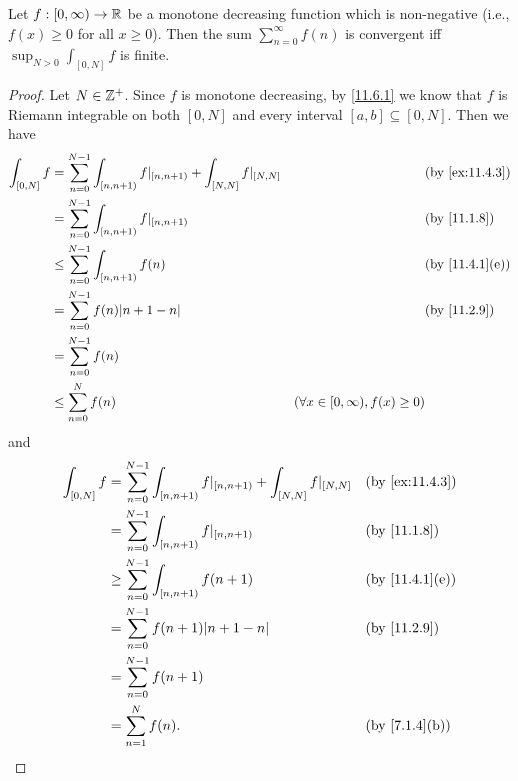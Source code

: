 \begin{prop}\label{11.6.4}
  Let \(f : [0, \infty) \to \mathbb{R}\) be a monotone decreasing function which is non-negative
  (i.e., \(f(x) \geq 0\) for all \(x \geq 0\)).
  Then the sum \(\sum_{n = 0}^\infty f(n)\) is convergent iff \(\sup_{N > 0} \int_{[0, N]} f\) is finite.
\end{prop}

\begin{proof}
  Let \(N \in \mathbb{Z}^+\).
  Since \(f\) is monotone decreasing, by \cref{11.6.1} we know that \(f\) is Riemann integrable on both \([0, N]\) and every interval \([a, b] \subseteq [0, N]\).
  Then we have
  \begin{align*}
    \int_{[0, N]} f & = \sum_{n = 0}^{N - 1} \int_{[n, n + 1)} f|_{[n, n + 1)} + \int_{[N, N]} f|_{[N, N]} &                                          & \by{ex:11.4.3}               \\
                    & = \sum_{n = 0}^{N - 1} \int_{[n, n + 1)} f|_{[n, n + 1)}                             &                                          & \by{11.1.8}                  \\
                    & \leq \sum_{n = 0}^{N - 1} \int_{[n, n + 1)} f(n)                                     &                                          & \text{(by \cref{11.4.1}(e))} \\
                    & = \sum_{n = 0}^{N - 1} f(n) \abs{n + 1 - n}                                          &                                          & \by{11.2.9}                  \\
                    & = \sum_{n = 0}^{N - 1} f(n)                                                                                                                                    \\
                    & \leq \sum_{n = 0}^N f(n)                                                             & (\forall x \in [0, \infty), f(x) \geq 0)
  \end{align*}
  and
  \begin{align*}
    \int_{[0, N]} f & = \sum_{n = 0}^{N - 1} \int_{[n, n + 1)} f|_{[n, n + 1)} + \int_{[N, N]} f|_{[N, N]} &  & \by{ex:11.4.3}               \\
                    & = \sum_{n = 0}^{N - 1} \int_{[n, n + 1)} f|_{[n, n + 1)}                             &  & \by{11.1.8}                  \\
                    & \geq \sum_{n = 0}^{N - 1} \int_{[n, n + 1)} f(n + 1)                                 &  & \text{(by \cref{11.4.1}(e))} \\
                    & = \sum_{n = 0}^{N - 1} f(n + 1) \abs{n + 1 - n}                                      &  & \by{11.2.9}                  \\
                    & = \sum_{n = 0}^{N - 1} f(n + 1)                                                                                        \\
                    & = \sum_{n = 1}^N f(n).                                                               &  & \text{(by \cref{7.1.4}(b))}
  \end{align*}


\end{proof}
